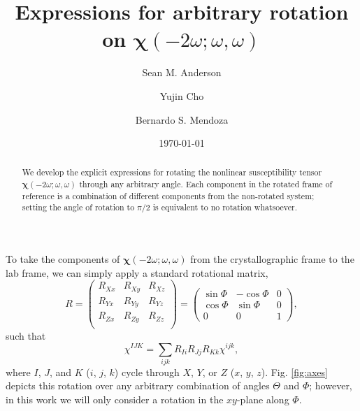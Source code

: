 \documentclass[aps,prb,10pt,letterpaper,notitlepage]{revtex4-1}
\begin{document}
\title{Expressions for arbitrary rotation on
\texorpdfstring{$\boldsymbol{\chi}(-2\omega;\omega,\omega)$}{X(2w)}}
\author{Sean M. Anderson}
\author{Yujin Cho}
\author{Bernardo S. Mendoza}
\date{\today}

\begin{abstract}
We develop the explicit expressions for rotating the nonlinear susceptibility
tensor $\boldsymbol{\chi}(-2\omega;\omega,\omega)$ through any arbitrary angle.
Each component in the rotated frame of reference is a combination of different
components from the non-rotated system; setting the angle of rotation to $\pi/2$
is equivalent to no rotation whatsoever.
\end{abstract}

\maketitle

To take the components of $\boldsymbol{\chi}(-2\omega;\omega,\omega)$ from the
crystallographic frame to the lab frame, we can simply apply a standard
rotational matrix,
\begin{equation*}
R =
\begin{pmatrix}
R_{Xx} & R_{Xy} & R_{Xz} \\
R_{Yx} & R_{Yy} & R_{Yz} \\
R_{Zx} & R_{Zy} & R_{Zz} \\
\end{pmatrix}
=
\begin{pmatrix}
\sin\Phi & -\cos\Phi & 0 \\
\cos\Phi &  \sin\Phi & 0 \\
    0    &      0    & 1
\end{pmatrix},
\end{equation*}
such that
\begin{equation*}
\chi^{IJK} = \sum_{ijk}R_{Ii}R_{Jj}R_{Kk}\chi^{ijk},
\end{equation*}
where $I$, $J$, and $K$ ($i$, $j$, $k$) cycle through $X$, $Y$, or $Z$ ($x$,
$y$, $z$). Fig. \ref{fig:axes} depicts this rotation over any arbitrary
combination of angles $\Theta$ and $\Phi$; however, in this work we will only
consider a rotation in the $xy$-plane along $\Phi$.
\end{document}
